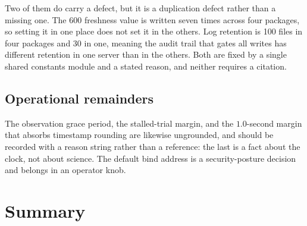 \documentclass[11pt,letterpaper]{article}
\begin{document}
Two of them do carry a defect, but it is a duplication defect rather than a
missing one. The $600$ freshness value is written seven times across four
packages, so setting it in one place does not set it in the others. Log
retention is 100 files in four packages and 30 in one, meaning the audit trail
that gates all writes has different retention in one server than in the others.
Both are fixed by a single shared constants module and a stated reason, and
neither requires a citation.

\subsection{Operational remainders}

The observation grace period, the stalled-trial margin, and the $1.0$-second
margin that absorbs timestamp rounding are likewise ungrounded, and should be
recorded with a reason string rather than a reference: the last is a fact about
the clock, not about science. The default bind address is a security-posture
decision and belongs in an operator knob.

\section{Summary}
\label{sec:results}
\end{document}
